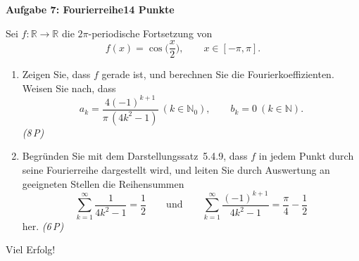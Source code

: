 \documentclass[a4paper,12pt]{article}
\newcommand{\pkt}[1]{\hfill\textit{(#1\,P)}}
\newcommand{\aufgabe}[3]{%
  \bigskip\par\noindent\textbf{Aufgabe #1: #2}\hfill\textbf{#3 Punkte}%
  \par\nobreak\medskip}
\begin{document}
\aufgabe{7}{Fourierreihe}{14}

Sei $f:\mathbb{R}\to\mathbb{R}$ die $2\pi$-periodische Fortsetzung von
\[ f(x)=\cos\!\Big(\frac{x}{2}\Big),\qquad x\in[-\pi,\pi]. \]
\begin{enumerate}[label=\alph*)]
  \item Zeigen Sie, dass $f$ gerade ist, und berechnen Sie die Fourierkoeffizienten. Weisen Sie nach, dass
  \[ a_k=\frac{4(-1)^{k+1}}{\pi\,(4k^{2}-1)}\ (k\in\mathbb{N}_0),\qquad b_k=0\ (k\in\mathbb{N}). \]
  \pkt{8}
  \item Begründen Sie mit dem Darstellungssatz~5.4.9, dass $f$ in jedem Punkt durch seine Fourierreihe dargestellt wird, und leiten Sie durch Auswertung an geeigneten Stellen die Reihensummen
  \[ \sum_{k=1}^{\infty}\frac{1}{4k^{2}-1}=\frac{1}{2}\qquad\text{und}\qquad
     \sum_{k=1}^{\infty}\frac{(-1)^{k+1}}{4k^{2}-1}=\frac{\pi}{4}-\frac{1}{2} \]
  her. \pkt{6}
\end{enumerate}

\vfill
\begin{center}\small Viel Erfolg!\end{center}
\end{document}
